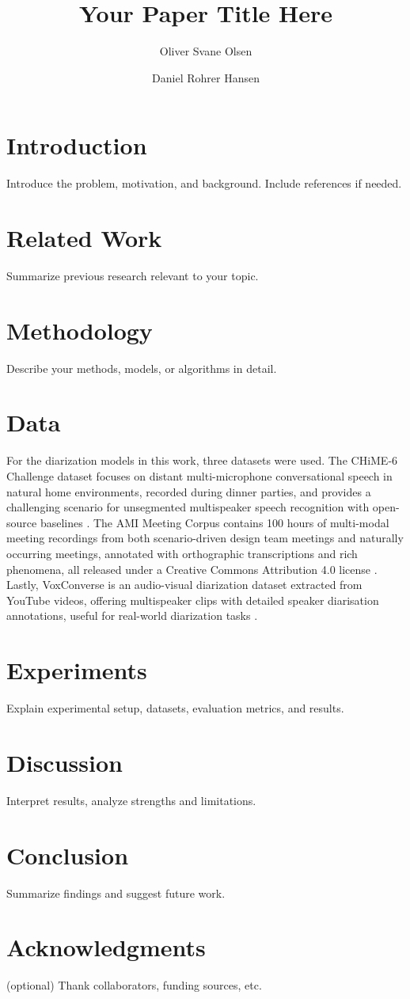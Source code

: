\documentclass[10pt,twocolumn]{article}
\title{Your Paper Title Here}
\author[1]{Oliver Svane Olsen}
\author[2]{Daniel Rohrer Hansen}
\affil[1]{Co-Engineering Aps\\ \texttt{olol@coec.dk}}
\affil[2]{Co-Engineering Aps\\ \texttt{daha@coec.dk}}
\date{}
\begin{document}

\section{Introduction}
Introduce the problem, motivation, and background. Include references if needed.

\section{Related Work}
Summarize previous research relevant to your topic.

\section{Methodology}
Describe your methods, models, or algorithms in detail.

\section{Data}
For the diarization models in this work, three datasets were used. The CHiME-6 Challenge dataset focuses on distant multi-microphone conversational speech in natural home environments, recorded during dinner parties, and provides a challenging scenario for unsegmented multispeaker speech recognition with open-source baselines \cite{watanabe2020chime}. The AMI Meeting Corpus contains 100 hours of multi-modal meeting recordings from both scenario-driven design team meetings and naturally occurring meetings, annotated with orthographic transcriptions and rich phenomena, all released under a Creative Commons Attribution 4.0 license \cite{carletta2006ami}. Lastly, VoxConverse is an audio-visual diarization dataset extracted from YouTube videos, offering multispeaker clips with detailed speaker diarisation annotations, useful for real-world diarization tasks \cite{chung2020spot}.

\section{Experiments}
Explain experimental setup, datasets, evaluation metrics, and results.

\section{Discussion}
Interpret results, analyze strengths and limitations.

\section{Conclusion}
Summarize findings and suggest future work.

\section*{Acknowledgments}
(optional) Thank collaborators, funding sources, etc.



\end{document}
